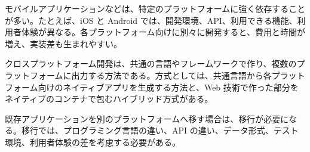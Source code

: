 モバイルアプリケーションなどは、特定のプラットフォームに強く依存することが多い。たとえば、iOS と Android では、開発環境、API、利用できる機能、利用者体験が異なる。各プラットフォーム向けに別々に開発すると、費用と時間が増え、実装差も生まれやすい。

クロスプラットフォーム開発は、共通の言語やフレームワークで作り、複数のプラットフォームに出力する方法である。方式としては、共通言語から各プラットフォーム向けのネイティブアプリを生成する方法と、Web 技術で作った部分をネイティブのコンテナで包むハイブリッド方式がある。

既存アプリケーションを別のプラットフォームへ移す場合は、移行が必要になる。移行では、プログラミング言語の違い、API の違い、データ形式、テスト環境、利用者体験の差を考慮する必要がある。
